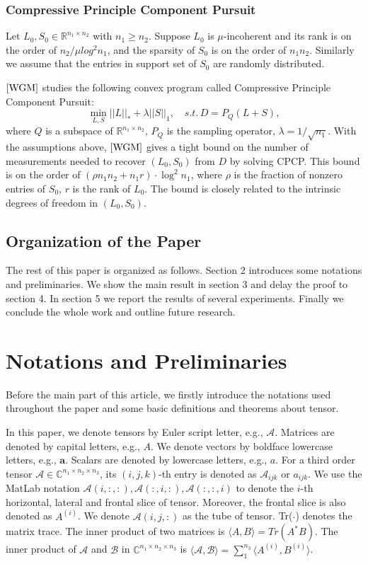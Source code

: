 \documentclass[journal,transmag]{IEEEtran}
\theoremstyle{plain}
\begin{document}
\subsubsection{Compressive Principle Component Pursuit}
Let $L_0, S_0\in \mathbb{R}^{n_1\times n_2}$ with $n_1\ge n_2$. Suppose $L_0$ is $\mu$-incoherent and its rank is on the order of $n_2/\mu log^2 n_1$, and the sparsity of $S_0$ is on the order of $n_1 n_2$. Similarly we assume that the entries in support set of $S_0$ are randomly distributed.

$\cite{WGM}$ studies the following convex program called Compressive Principle Component Pursuit:
\begin{equation}
\min_{L,S}||L||_{*}+\lambda ||S||_1, \quad s.t.\, D=P_Q(L+S),
\end{equation}
where $Q$ is a subspace of $\mathbb{R}^{n_1\times n_2}$, $P_Q$ is the sampling operator, $\lambda=1/\sqrt{n_1}$. With the assumptions above, $\cite{WGM}$ gives a tight bound on the number of measurements needed to recover $(L_0, S_0)$ from $D$ by solving CPCP. This bound is on the order of $(\rho n_1 n_2 + n_1 r)\cdot \log^2 n_1$, where $\rho$ is the fraction of nonzero entries of $S_0$, $r$ is the rank of $L_0$. The bound is closely related to the intrinsic degrees of freedom in $(L_0, S_0)$.
\subsection{Organization of the Paper}
The rest of this paper is organized as follows. Section 2 introduces some notations and preliminaries. We show the main result in section 3 and delay the proof to section 4. In section 5 we report the results of several experiments. Finally we conclude the whole work and outline future research.
\section{Notations and Preliminaries}
Before the main part of this article, we firstly introduce the notations used throughout the paper and some basic definitions and theorems about tensor.

In this paper, we denote tensors by Euler script letter, e.g., $\mathcal{A}$. Matrices are denoted by capital letters, e.g., $A$. We denote vectors by boldface lowercase letters, e.g., $\textbf{a}$. Scalars are denoted by lowercase letters, e.g., $a$. For a third order tensor $\mathcal{A}\in \mathbb{C}^{n_1\times n_2\times n_3}$, its $(i,j,k)$-th entry is denoted as $\mathcal{A}_{ijk}$ or $a_{ijk}$. We use the MatLab notation $\mathcal{A}(i,:,:), \mathcal{A}(:,i,:), \mathcal{A}(:,:,i)$ to denote the $i$-th horizontal, lateral and frontal slice of tensor. Moreover, the frontal slice is also denoted as $A^{(i)}$. We denote $\mathcal{A}(i,j,:)$ as the tube of tensor. Tr($\cdot$) denotes the matrix trace. The inner product of two matrices is $\langle A,B\rangle = Tr(A^*B)$. The inner product of $\mathcal{A}$ and $\mathcal{B}$ in $\mathbb{C}^{n_1 \times n_2 \times n_3}$ is $\langle\mathcal{A},\mathcal{B}\rangle=\sum_1^{n_3}\langle A^{(i)},B^{(i)}\rangle$.
\end{document}

